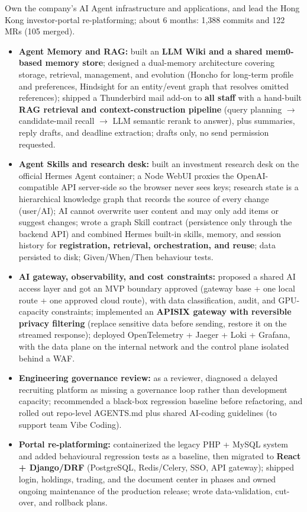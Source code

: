 \documentclass[10pt,a4paper]{article}
\begin{document}
Own the company's AI Agent infrastructure and applications, and lead the Hong Kong investor-portal re-platforming; about 6 months: 1,388 commits and 122 MRs (105 merged).
\begin{itemize}
	\item \textbf{Agent Memory and RAG:} built an \textbf{LLM Wiki and a shared mem0-based memory store}; designed a dual-memory architecture covering storage, retrieval, management, and evolution (Honcho for long-term profile and preferences, Hindsight for an entity/event graph that resolves omitted references); shipped a Thunderbird mail add-on to \textbf{all staff} with a hand-built \textbf{RAG retrieval and context-construction pipeline} (query planning $\rightarrow$ candidate-mail recall $\rightarrow$ LLM semantic rerank to answer), plus summaries, reply drafts, and deadline extraction; drafts only, no send permission requested.
	\item \textbf{Agent Skills and research desk:} built an investment research desk on the official Hermes Agent container; a Node WebUI proxies the OpenAI-compatible API server-side so the browser never sees keys; research state is a hierarchical knowledge graph that records the source of every change (user/AI); AI cannot overwrite user content and may only add items or suggest changes; wrote a graph Skill contract (persistence only through the backend API) and combined Hermes built-in skills, memory, and session history for \textbf{registration, retrieval, orchestration, and reuse}; data persisted to disk; Given/When/Then behaviour tests.
	\item \textbf{AI gateway, observability, and cost constraints:} proposed a shared AI access layer and got an MVP boundary approved (gateway base + one local route + one approved cloud route), with data classification, audit, and GPU-capacity constraints; implemented an \textbf{APISIX gateway with reversible privacy filtering} (replace sensitive data before sending, restore it on the streamed response); deployed OpenTelemetry + Jaeger + Loki + Grafana, with the data plane on the internal network and the control plane isolated behind a WAF.
	\item \textbf{Engineering governance review:} as a reviewer, diagnosed a delayed recruiting platform as missing a governance loop rather than development capacity; recommended a black-box regression baseline before refactoring, and rolled out repo-level AGENTS.md plus shared AI-coding guidelines (to support team Vibe Coding).
	\item \textbf{Portal re-platforming:} containerized the legacy PHP + MySQL system and added behavioural regression tests as a baseline, then migrated to \textbf{React + Django/DRF} (PostgreSQL, Redis/Celery, SSO, API gateway); shipped login, holdings, trading, and the document center in phases and owned ongoing maintenance of the production release; wrote data-validation, cut-over, and rollback plans.

\end{itemize}
\end{document}
